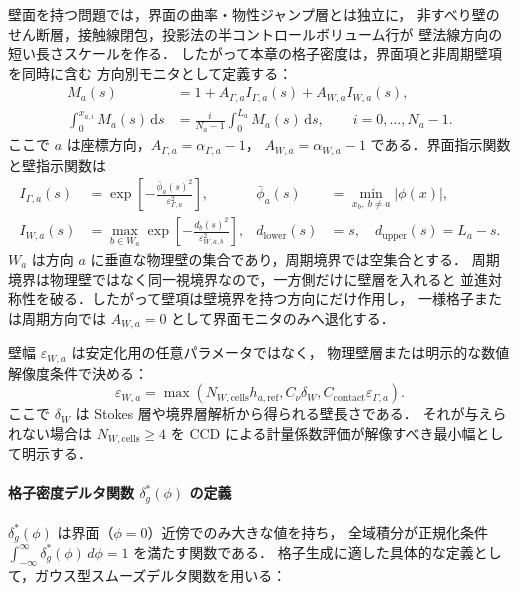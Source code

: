 壁面を持つ問題では，界面の曲率・物性ジャンプ層とは独立に，
非すべり壁のせん断層，接触線閉包，投影法の半コントロールボリューム行が
壁法線方向の短い長さスケールを作る．
したがって本章の格子密度は，界面項と非周期壁項を同時に含む
方向別モニタとして定義する：
\begin{align}
  M_a(s) &= 1 + A_{\Gamma,a} I_{\Gamma,a}(s) + A_{W,a} I_{W,a}(s),
  \label{eq:grid_composite_monitor} \\
  \int_0^{x_{a,i}} M_a(s)\,\mathrm{d}s
  &= \frac{i}{N_a-1}\int_0^{L_a} M_a(s)\,\mathrm{d}s,
  \qquad i=0,\ldots,N_a-1 .
  \label{eq:grid_composite_equidistribution}
\end{align}
ここで $a$ は座標方向，$A_{\Gamma,a}=\alpha_{\Gamma,a}-1$，
$A_{W,a}=\alpha_{W,a}-1$ である．界面指示関数と壁指示関数は
\begin{align}
  I_{\Gamma,a}(s)
    &= \exp\!\left[-\frac{\bar{\phi}_a(s)^2}{\varepsilon_{\Gamma,a}^2}\right],
  &
  \bar{\phi}_a(s)
    &= \min_{x_b,\ b\ne a}|\phi(x)|,
  \\
  I_{W,a}(s)
    &= \max_{b\in W_a}\exp\!\left[-\frac{d_b(s)^2}{\varepsilon_{W,a,b}^2}\right],
  &
  d_{\mathrm{lower}}(s)&=s,\quad
  d_{\mathrm{upper}}(s)=L_a-s .
\end{align}
$W_a$ は方向 $a$ に垂直な物理壁の集合であり，周期境界では空集合とする．
周期境界は物理壁ではなく同一視境界なので，一方側だけに壁層を入れると
並進対称性を破る．したがって壁項は壁境界を持つ方向にだけ作用し，
一様格子または周期方向では $A_{W,a}=0$ として界面モニタのみへ退化する．

壁幅 $\varepsilon_{W,a}$ は安定化用の任意パラメータではなく，
物理壁層または明示的な数値解像度条件で決める：
\begin{equation}
  \varepsilon_{W,a}
  =
  \max\!\left(
    N_{W,\mathrm{cells}}h_{a,\mathrm{ref}},
    C_\nu\delta_W,
    C_{\mathrm{contact}}\varepsilon_{\Gamma,a}
  \right).
  \label{eq:grid_wall_width_policy}
\end{equation}
ここで $\delta_W$ は Stokes 層や境界層解析から得られる壁長さである．
それが与えられない場合は $N_{W,\mathrm{cells}}\ge4$ を
CCD による計量係数評価が解像すべき最小幅として明示する．

\paragraph{格子密度デルタ関数 \texorpdfstring{$\delta_g^*(\phi)$}{delta*g(phi)} の定義}

$\delta_g^*(\phi)$ は界面（$\phi=0$）近傍でのみ大きな値を持ち，
全域積分が正規化条件 $\int_{-\infty}^{\infty}\delta_g^*(\phi)\,d\phi = 1$ を満たす関数である．
格子生成に適した具体的な定義として，ガウス型スムーズデルタ関数を用いる：


